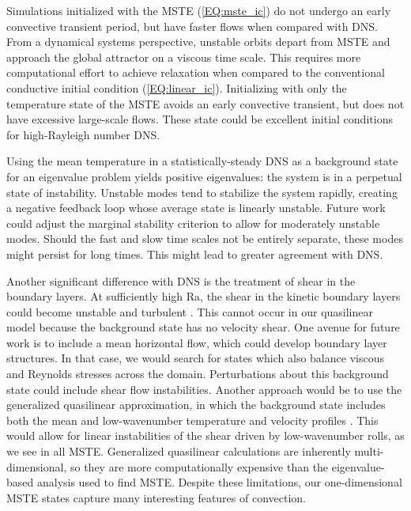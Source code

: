 \documentclass[reprint,amsmath,amssymb,aps,nofootinbib]{revtex4-1}
\newcommand\Ra{\mathrm{Ra}}
\newcommand{\eq}[1]{(\ref{#1})}
\begin{document}
Simulations initialized with the MSTE \eq{EQ:mste_ic} do not undergo an early convective transient period, but have faster flows when compared with DNS.
From a dynamical systems perspective, unstable orbits depart from MSTE and approach the global attractor on a viscous time scale.
This requires more computational effort to achieve relaxation when compared to the conventional conductive initial condition \eq{EQ:linear_ic}.
Initializing with only the temperature state of the MSTE avoids an early convective transient, but does not have excessive large-scale flows.
These state could be excellent initial conditions for high-Rayleigh number DNS.

Using the mean temperature in a statistically-steady DNS as a background state for an eigenvalue problem yields positive eigenvalues: the system is in a perpetual state of instability. 
Unstable modes tend to stabilize the system rapidly, creating a negative feedback loop whose average state is linearly unstable. 
Future work could adjust the marginal stability criterion to allow for moderately unstable modes.
Should the fast and slow time scales not be entirely separate, these modes might persist for long times. 
This might lead to greater agreement with DNS.

Another significant difference with DNS is the treatment of shear in the boundary layers.
At sufficiently high $\Ra$, the shear in the kinetic boundary layers could become unstable and turbulent \cite{Ahlers}.
This cannot occur in our quasilinear model because the background state has no velocity shear.
One avenue for future work is to include a mean horizontal flow, which could develop boundary layer structures.
In that case, we would search for states which also balance viscous and Reynolds stresses across the domain.
Perturbations about this background state could include shear flow instabilities.
Another approach would be to use the generalized quasilinear approximation, in which the background state includes both the mean and low-wavenumber temperature and velocity profiles \cite{marston2016}.
This would allow for linear instabilities of the shear driven by low-wavenumber rolls, as we see in all MSTE.
Generalized quasilinear calculations are inherently multi-dimensional, so they are more computationally expensive than the eigenvalue-based analysis used to find MSTE.
Despite these limitations, our one-dimensional MSTE states capture many interesting features of convection.


\end{document}
